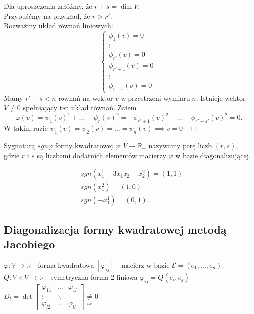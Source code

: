 \documentclass[../main.tex]{subfiles}
\begin{document}
    Dla uproszczenia załóżmy, że $r+s = \dim V$.\\
    Przypuśćmy na przykład, że $r > r'$.\\
    Rozważmy układ równań liniowych:\\
\[
    \begin{cases}
        \phi_1(v) = 0\\
        \vdots\\
        \phi_{r'}(v) = 0\\
        \phi_{r'+1}(v) = 0\\
        \vdots\\
        \phi_{r+s}(v) = 0
    \end{cases}
.\]
    Mamy $r'+s < n$ równań na wektor $v$ w przestrzeni wymiaru $n$. Istnieje wektor $V\neq 0$ spełniający ten układ równań. Zatem
    \[
        \varphi(v) = \psi_1(v)^1 + \ldots + \psi_r(v)^2 = -\phi_{r'+1}(v)^2 - \ldots - \phi_{r'+s'}(v)^2 = 0
    .\]
    W takim razie $\psi_1(v) = \psi_2(v) = \ldots = \psi_n(v) \implies v = 0 \quad\Box$

    \begin{definicja}
        Sygnaturą $sgn \varphi$ formy kwadratowej $\varphi: V\to\mathbb{R}_{-}$ nazywamy parę liczb $(r,s)$, gdzie $r$ i $s$ są liczbami dodatnich elementów macierzy $\varphi$ w bazie diagonalizującej.
    \end{definicja}
    \begin{przyklad}

        \begin{align*}
            &sgn (x_1^1 - 3x_1x_2 + x_2^2 ) = (1,1)\\
            &sgn (x_1^2) = (1,0)\\
            &sgn(-x_1^1) = (0,1)
        .\end{align*}

    \end{przyklad}

    \subsection{Diagonalizacja formy kwadratowej metodą Jacobiego}
    $\varphi: V\to\mathbb{R}$ - forma kwadratowa $\left[ \varphi_{ij} \right] $ - macierz w bazie $\mathcal{E} = \left( e_1,\ldots,e_n \right) .$\\
    $Q:V\times V \to\mathbb{R}$ - symetryczna forma 2-liniowa $\varphi_{ij} = Q(e_i,e_j)$ \\
    $D_l = \det \begin{bmatrix} \varphi_{11}&\ldots&\varphi_{1l}\\
    \vdots&\ddots&\vdots\\\varphi_{l2}&\ldots&\varphi_{ll}\end{bmatrix} \underset{\text{zał}}{\neq} 0$
\end{document}
